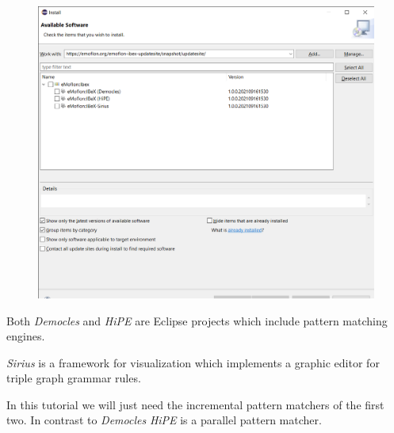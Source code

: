 \begin{figure}[h]
    \centering
    \includegraphics[scale=0.4, width =\textwidth]{pictures/eclipse-workspace - HospitalExample_model_HospitalExample.ecore - Eclipse IDE 08.11.2021 18_02_54.png}
    \caption{}
    \label{screenshot install new software eMoflon::IBeX}
\end{figure}

Both \textsf{\textit{Democles}} and \textsf{\textit{HiPE}} are Eclipse projects which include pattern matching engines.


\textsf{\textit{Sirius}} is a framework for visualization which implements a graphic editor for triple graph grammar rules.\newline 

In this tutorial we will just need the incremental pattern matchers of the first two. In contrast to \textsf{\textit{Democles}} \textsf{\textit{HiPE}} is a parallel pattern matcher.

\clearpage
